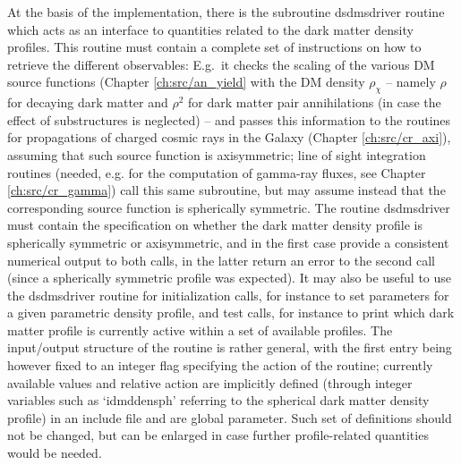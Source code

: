\documentclass[a4paper,10pt,oneside]{book}
\newcommand{\code}[1]{\ft{#1}}
\newcommand{\ft}[1]{\textsf{#1}}
\begin{document}
At the basis of the implementation, there is the subroutine \code{dsdmsdriver} routine which acts as an interface to quantities related to
the dark matter density profiles. This routine must contain a complete set of instructions on how to retrieve the different observables: E.g.~it checks the scaling of the various DM source functions (Chapter \ref{ch:src/an_yield}
with the DM density $\rho_\chi$ -- namely $\rho$ for decaying dark matter and $\rho^2$
for dark matter pair annihilations (in case the effect of substructures is neglected) -- and passes this information
to the routines for propagations of charged cosmic rays in the Galaxy (Chapter \ref{ch:src/cr_axi}), 
assuming that such source function is axisymmetric; line of sight integration routines (needed, e.g. for the computation of gamma-ray fluxes, see Chapter \ref{ch:src/cr_gamma})
call this same subroutine, but may assume instead that the corresponding source function is spherically symmetric. The routine 
\code{dsdmsdriver} must contain the specification on whether the dark matter density profile is spherically symmetric 
or axisymmetric, and in the first case provide a consistent numerical output to both calls, in the latter return an error to the
second call (since a spherically symmetric profile was expected). It may also be useful to use the \code{dsdmsdriver} routine for 
initialization calls, for instance to set parameters for a given parametric density profile, and test calls, for instance to print
which dark matter profile is currently active within a set of available profiles. The input/output structure of the routine is rather
general, with the first entry being however fixed to an integer flag specifying the action of the routine; currently 
available values and relative action are implicitly defined (through integer variables 
such as `\code{idmddensph}' referring to the spherical dark matter density profile) in an include file and are global parameter. 
Such set of definitions should not be changed, but can be enlarged in case further profile-related quantities would be needed.
\end{document}
